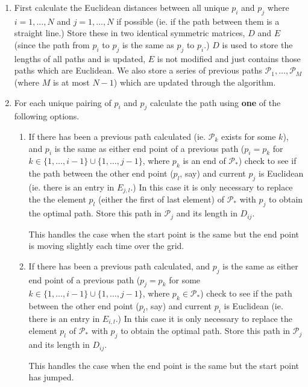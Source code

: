 \documentclass[a4paper,10pt]{article}
\begin{document}
\begin{enumerate}
\item First calculate the Euclidean distances between all unique $p_i$ and $p_j$ where $i=1,\dots, N$ and $j=1,\dots, N$ if possible (ie. if the path between them is a straight line.) Store these in two identical symmetric matrices, $D$ and $E$ (since the path from  $p_i$ to $p_j$ is the same as  $p_j$ to $p_i$.) $D$ is used to store the lengths of all paths and is updated, $E$ is not modified and just contains those paths which are Euclidean. We also store a series of previous paths $\mathcal{P}_1,\ldots, \mathcal{P}_M$ (where $M$ is at most $N-1$) which are updated through the algorithm.

\item For each unique pairing of $p_i$ and $p_j$ calculate the path using \textbf{one} of the following options.

\begin{enumerate}

\item If there has been a previous path calculated (ie. $\mathcal{P}_k$ exists for some $k$), and $p_i$ is the same as either end point of a previous path ($p_i=p_{k}$ for $k \in \{1,\dots, i-1\} \cup \{1,\dots, j-1\}$, where $p_k$ is an end of $\mathcal{P}_*$) check to see if the path between the other end point ($p_l$, say) and current $p_j$ is Euclidean (ie. there is an entry in $E_{j,l}$.) In this case it is only necessary to replace the the element $p_l$ (either the first of last element) of $\mathcal{P}_{*}$ with $p_j$ to obtain the optimal path. Store this path in $\mathcal{P}_{j}$ and its length in $D_{ij}$.

This handles the case when the start point is the same but the end point is moving slightly each time over the grid.

\item If there has been a previous path calculated, and $p_j$ is the same as either end point of a previous path ($p_j=p_{k}$ for some $k \in \{1,\dots, i-1\} \cup \{1,\dots, j-1\}$, where $p_k \in \mathcal{P}_*$) check to see if the path between the other end point ($p_l$, say) and current $p_i$ is Euclidean (ie. there is an entry in $E_{i,l}$.) In this case it is only necessary to replace the element $p_l$ of $\mathcal{P}_{*}$ with $p_j$ to obtain the optimal path. Store this path in $\mathcal{P}_{j}$ and its length in $D_{ij}$.

This handles the case when the end point is the same but the start point has jumped.


\end{enumerate}
\end{enumerate}
\end{document}
